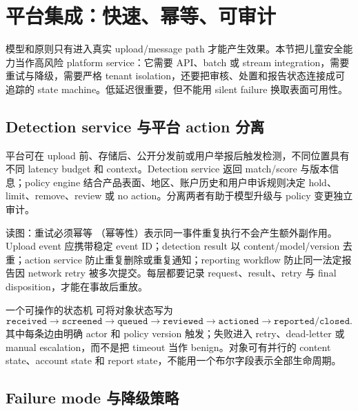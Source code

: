 \section{平台集成：快速、幂等、可审计}

模型和原则只有进入真实 upload/message path 才能产生效果。本节把儿童安全能力当作高风险 platform service：它需要 API、batch 或 stream integration，需要重试与降级，需要严格 tenant isolation，还要把审核、处置和报告状态连接成可追踪的 state machine。低延迟很重要，但不能用 silent failure 换取表面可用性。

\subsection{Detection service 与平台 action 分离}

平台可在 upload 前、存储后、公开分发前或用户举报后触发检测，不同位置具有不同 latency budget 和 context。Detection service 返回 match/score 与版本信息；policy engine 结合产品表面、地区、账户历史和用户申诉规则决定 hold、limit、remove、review 或 no action。分离两者有助于模型升级与 policy 变更独立审计。


\begin{knowledgebox}{读图：重试必须幂等}
（幂等性）表示同一事件重复执行不会产生额外副作用。Upload event 应携带稳定 event ID；detection result 以 content/model/version 去重；action service 防止重复删除或重复通知；reporting workflow 防止同一法定报告因 network retry 被多次提交。每层都要记录 request、result、retry 与 final disposition，才能在事故后重放。
\end{knowledgebox}

\begin{importantbox}{一个可操作的状态机}
可将对象状态写为
\[
\texttt{received}\rightarrow\texttt{screened}\rightarrow
\texttt{queued}\rightarrow\texttt{reviewed}\rightarrow
\texttt{actioned}\rightarrow\texttt{reported/closed}.
\]
其中每条边由明确 actor 和 policy version 触发；失败进入 retry、dead-letter 或 manual escalation，而不是把 timeout 当作 benign。对象可有并行的 content state、account state 和 report state，不能用一个布尔字段表示全部生命周期。
\end{importantbox}

\subsection{Failure mode 与降级策略}


